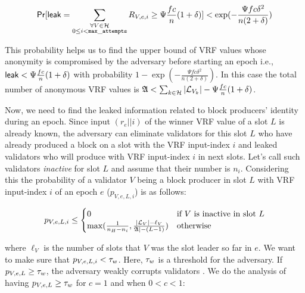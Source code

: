 \begin{equation}\label{eq:beforeepcoh}
\mathsf{Pr}[\mathsf{leak} = \sum_{\substack{ \forall V \in \mathcal{H} \\0\leq i < \mathtt{max\_attempts}}} R_{V,e,i} \geq \Psi \frac{fc}{n} (1+ \delta)] < \exp(-\frac{\Psi f c\delta^2}{n(2+\delta)}) \nonumber
\end{equation}


This probability helps us to find the upper bound of VRF values whose anonymity is compromised by the adversary before starting an epoch i.e., $ \mathsf{leak} < \Psi \frac{fc}{n} (1+ \delta) $ with probability $ 1- \exp(-\frac{\Psi f c\delta^2}{n(2+\delta)}) $. In this case the total number of anonymous VRF values is $  \mathfrak{A} < \sum_{k \in \mathcal{H}} |\mathcal{L}_{V_k}| -  \Psi \frac{fc}{n} (1+ \delta)$.

Now, we need to find the leaked information related to block producers' identity during an epoch. 
Since input $ (r_e||i) $ of the winner VRF value of a slot $ L $ is already known, the adversary can eliminate validators for this slot $ L $ who have already produced a block on a slot with the VRF input-index $ i $ and leaked validators who will produce with VRF input-index $ i $ in next slots. Let's call such validators \emph{inactive} for slot $ L $ and assume that their number is $ n_i $. Considering this the probability of a validator $ V $ being a block producer in slot $ L $ with VRF input-index $ i $ of an epoch $ e $ ($ p_{V,e, L, i} $)  is as follows:

\begin{equation*}
p_{V,e, L, i} \leq \begin{cases}
0 &\text{if } V \text{ is inactive in slot } L\\
\max(\frac{1}{n_H - n_i},\frac{|\mathcal{L}_V|- \ell_V}{\mathfrak{A}|-(L-1)})&\text{otherwise}
\end{cases}
\end{equation*}

where  $ \ell_V $ is the number of slots that $ V $ was the slot leader so far in $ e $. We want to make sure that $ p_{V,e,L,i} < \tau_w$. Here, $ \tau_w $ is a threshold for the adversary. If $ p_{V,e,L} \geq \tau_w $, the adversary weakly corrupts validators . We do the analysis of having $ p_{V,e,L} \geq \tau_w $ for $ c =1 $ and when $ 0 < c < 1 $:

